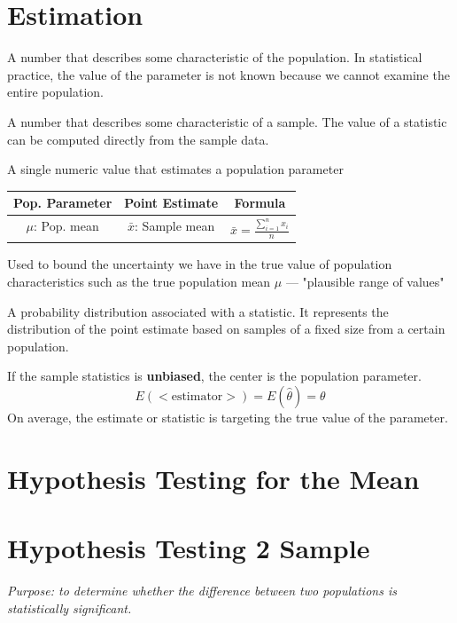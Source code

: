 \documentclass[]{article}
\newenvironment{definitions}{
	\begin{description}[font=\sffamily\bfseries, leftmargin=1cm, style=nextline]
	}{
	\end{description}
}
\begin{document}
\section{Estimation}
\begin{definitions}
	\item[Parameter] A number that describes some characteristic of the population. In statistical practice, the value of the parameter is not known because we cannot examine the entire population.
	\item[Statistic] A number that describes some characteristic of a sample. The value of a statistic can be computed directly from the sample data.
	\item[Point Estimate] A single numeric value that estimates a population parameter
	\begin{center}\begin{tabular}{||c|c|c||}
		\hline
		Pop. Parameter & Point Estimate & Formula\\
		\hline\hline
		$\mu$: Pop. mean & $\bar{x}$: Sample mean & \multirow{2}{7em}{$\bar{x} = \frac{\sum_{i=1}^{n} x_i}{n}$}\\
		&&\\
		\hline
	\end{tabular}\end{center}
	\item[Confidence Interval] Used to bound the uncertainty we have in the true value of population characteristics such as the true population mean $\mu$ --- "plausible range of values"
	\item[Sampling Distribution] A probability distribution associated with a statistic. It represents the distribution of the point estimate based on samples of a fixed size from a certain population.
	\item[Center of the Sampling Distribution]
	If the sample statistics is \textbf{unbiased}, the center is the population parameter.
		\[E(<\text{estimator}>) = E(\hat{\theta}) = \theta\]
	On average, the estimate or statistic is targeting the true value of the parameter.
\end{definitions}

\section{Hypothesis Testing for the Mean}

\section{Hypothesis Testing 2 Sample}
\emph{Purpose: to determine whether the difference between two populations is statistically significant.}\\
\end{document}

